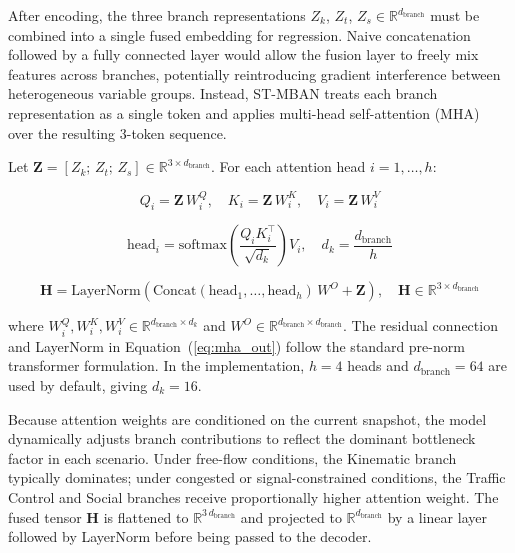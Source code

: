 \documentclass[journal]{IEEEtran}
\begin{document}
After encoding, the three branch representations $Z_k$, $Z_t$, $Z_s \in \mathbb{R}^{d_\text{branch}}$ must be combined into a single fused embedding for regression.
Naive concatenation followed by a fully connected layer would allow the fusion layer to freely mix features across branches, potentially reintroducing gradient interference between heterogeneous variable groups.
Instead, ST-MBAN treats each branch representation as a single token and applies multi-head self-attention (MHA)~\cite{Vaswani2017} over the resulting 3-token sequence.

Let $\mathbf{Z} = [Z_k;\, Z_t;\, Z_s] \in \mathbb{R}^{3 \times d_\text{branch}}$.
For each attention head $i = 1, \ldots, h$:

\begin{equation}
Q_i = \mathbf{Z}\, W^Q_i,\quad K_i = \mathbf{Z}\, W^K_i,\quad V_i = \mathbf{Z}\, W^V_i
\label{eq:mha_proj}
\end{equation}

\begin{equation}
\text{head}_i = \text{softmax}\!\left(\frac{Q_i K_i^\top}{\sqrt{d_k}}\right) V_i,\quad d_k = \frac{d_\text{branch}}{h}
\label{eq:mha_head}
\end{equation}

\begin{equation}
\mathbf{H} = \text{LayerNorm}\!\left(\text{Concat}(\text{head}_1,\ldots,\text{head}_h)\, W^O + \mathbf{Z}\right), \quad \mathbf{H} \in \mathbb{R}^{3 \times d_\text{branch}}
\label{eq:mha_out}
\end{equation}

where $W^Q_i, W^K_i, W^V_i \in \mathbb{R}^{d_\text{branch} \times d_k}$ and $W^O \in \mathbb{R}^{d_\text{branch} \times d_\text{branch}}$.
The residual connection and LayerNorm in Equation~(\ref{eq:mha_out}) follow the standard pre-norm transformer formulation.
In the implementation, $h = 4$ heads and $d_\text{branch} = 64$ are used by default, giving $d_k = 16$.

Because attention weights are conditioned on the current snapshot, the model dynamically adjusts branch contributions to reflect the dominant bottleneck factor in each scenario.
Under free-flow conditions, the Kinematic branch typically dominates; under congested or signal-constrained conditions, the Traffic Control and Social branches receive proportionally higher attention weight.
The fused tensor $\mathbf{H}$ is flattened to $\mathbb{R}^{3\,d_\text{branch}}$ and projected to $\mathbb{R}^{d_\text{branch}}$ by a linear layer followed by LayerNorm before being passed to the decoder.
\end{document}

